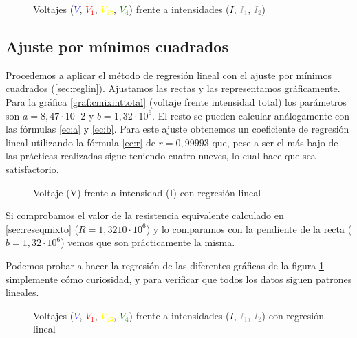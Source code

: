 \documentclass[12pt, a4paper, titlepage]{article}
\begin{document}
  \begin{figure}[H]
    \centering
    
    
    
    \caption{Voltajes (\textcolor{Blue}{$V$}, \textcolor{Red}{$V_1$}, \textcolor{Yellow}{$V_{23}$}, \textcolor{Green}{$V_4$}) frente a intensidades (\textcolor{Black}{$I$}, \textcolor{DarkGrey}{$I_1$}, \textcolor{Grey}{$I_2$})}
    \label{graf:cmixmulti}
  \end{figure}

  \subsection{Ajuste por mínimos cuadrados}
  \label{v:mixto}

  Procedemos a aplicar el método de regresión lineal con el ajuste por mínimos cuadrados (\ref{sec:reglin}). Ajustamos las rectas y las representamos gráficamente. Para la gráfica \ref{graf:cmixinttotal} (voltaje frente intensidad total) los parámetros son $a = 8,47 \cdot 10^-2$ y $b = 1,32 \cdot 10^6$. El resto se pueden calcular análogamente con las fórmulas \ref{ec:a} y \ref{ec:b}. Para este ajuste obtenemos un coeficiente de regresión lineal utilizando la fórmula \ref{ec:r} de $r = 0,99993$ que, pese a ser el más bajo de las prácticas realizadas sigue teniendo cuatro nueves, lo cual hace que sea satisfactorio.

  \begin{figure}[H]
    \hspace{2.5em} 
    \caption{Voltaje (V) frente a intensidad (I) con regresión lineal}
  \end{figure}

  Si comprobamos el valor de la resistencia equivalente calculado en \ref{sec:reseqmixto} ($R = 1,3210 \cdot 10^6$) y lo comparamos con la pendiente de la recta ($b = 1,32 \cdot 10^6$) vemos que son prácticamente la misma.

  Podemos probar a hacer la regresión de las diferentes gráficas de la figura \ref{graf:cmixmulti} simplemente cómo curiosidad, y para verificar que todos los datos siguen patrones lineales.

  \begin{figure}[H]
    \centering
    
    
    
    \caption{Voltajes (\textcolor{Blue}{$V$}, \textcolor{Red}{$V_1$}, \textcolor{Yellow}{$V_{23}$}, \textcolor{Green}{$V_4$}) frente a intensidades (\textcolor{Black}{$I$}, \textcolor{DarkGrey}{$I_1$}, \textcolor{Grey}{$I_2$}) con regresión lineal}
  \end{figure}
\end{document}
